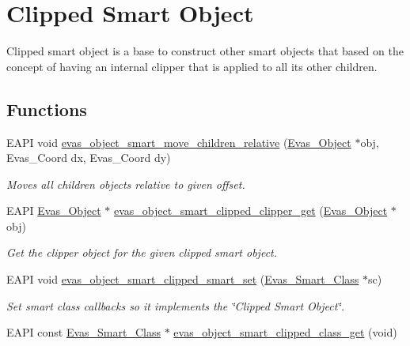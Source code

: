 \section{Clipped Smart Object}
\label{group__Evas__Smart__Object__Clipped}


Clipped smart object is a base to construct other smart objects that based on the concept of having an internal clipper that is applied to all its other children.  


\subsection*{Functions}
\begin{DoxyCompactItemize}
\item 
EAPI void \hyperlink{group__Evas__Smart__Object__Clipped_ga1e051786da49a712512430fcb6360c12}{evas\_\-object\_\-smart\_\-move\_\-children\_\-relative} (\hyperlink{group__Evas__Object__Group_ga9e19e6dd1f517a0ba437c0114d3e7c97}{Evas\_\-Object} $\ast$obj, Evas\_\-Coord dx, Evas\_\-Coord dy)
\begin{DoxyCompactList}\small\item\em Moves all children objects relative to given offset. \item\end{DoxyCompactList}\item 
EAPI \hyperlink{group__Evas__Object__Group_ga9e19e6dd1f517a0ba437c0114d3e7c97}{Evas\_\-Object} $\ast$ \hyperlink{group__Evas__Smart__Object__Clipped_ga27b74fdbecd5d915c9ec832199048907}{evas\_\-object\_\-smart\_\-clipped\_\-clipper\_\-get} (\hyperlink{group__Evas__Object__Group_ga9e19e6dd1f517a0ba437c0114d3e7c97}{Evas\_\-Object} $\ast$obj)
\begin{DoxyCompactList}\small\item\em Get the clipper object for the given clipped smart object. \item\end{DoxyCompactList}\item 
EAPI void \hyperlink{group__Evas__Smart__Object__Clipped_ga3725ce3a781c93120637ad6a58f6e628}{evas\_\-object\_\-smart\_\-clipped\_\-smart\_\-set} (\hyperlink{struct__Evas__Smart__Class}{Evas\_\-Smart\_\-Class} $\ast$sc)
\begin{DoxyCompactList}\small\item\em Set smart class callbacks so it implements the \char`\"{}Clipped Smart Object\char`\"{}. \item\end{DoxyCompactList}\item 
EAPI const \hyperlink{struct__Evas__Smart__Class}{Evas\_\-Smart\_\-Class} $\ast$ \hyperlink{group__Evas__Smart__Object__Clipped_ga83e064112f527be0c2156c425562a57c}{evas\_\-object\_\-smart\_\-clipped\_\-class\_\-get} (void)\label{group__Evas__Smart__Object__Clipped_ga83e064112f527be0c2156c425562a57c}


\end{DoxyCompactItemize}
